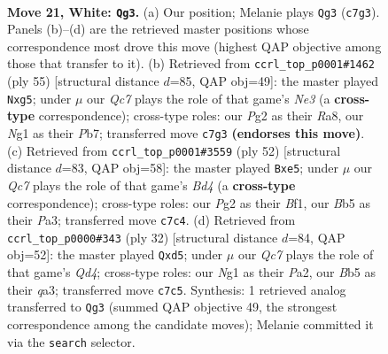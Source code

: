 \documentclass[11pt]{article}
\begin{document}
\clearpage

\begin{figure}[p]\centering
\begin{subfigure}{0.46\textwidth}\centering
\resizebox{\linewidth}{!}{%
\newchessgame
\chessboard[
  setfen={rn5r/2Q5/5p1k/pB1p3p/3P3q/4p3/PP3PP1/1R2K1N1 w - - 2 21},
  showmover=false,
  pgfstyle=straightmove, color=movearrow, markmove={c7-g3}
]}
\caption{}
\end{subfigure}\hfill
\begin{subfigure}{0.46\textwidth}\centering
\resizebox{\linewidth}{!}{%
\newchessgame
\chessboard[
  setfen={r5k1/pp6/1nppn3/5qBp/3P4/Q4P2/PP5P/4N1RK b - - 6 28},
  showmover=false,
  pgfstyle=straightmove, color=movearrow, markmove={e6-g5}
]}
\caption{}
\end{subfigure}
\\[4pt]
\begin{subfigure}{0.46\textwidth}\centering
\resizebox{\linewidth}{!}{%
\newchessgame
\chessboard[
  setfen={1k4r1/1p2bpp1/p2p4/4nP2/3Bq3/P5Q1/1PP5/1K1R1B2 w - - 0 27},
  showmover=false,
  pgfstyle=straightmove, color=movearrow, markmove={d4-e5}
]}
\caption{}
\end{subfigure}\hfill
\begin{subfigure}{0.46\textwidth}\centering
\resizebox{\linewidth}{!}{%
\newchessgame
\chessboard[
  setfen={2r1k2r/1R2bppp/p2p4/3n2B1/3QP3/q7/P1P3PP/4K2R w Kk - 0 17},
  showmover=false,
  pgfstyle=straightmove, color=movearrow, markmove={d4-d5}
]}
\caption{}
\end{subfigure}
\caption{\textbf{Move 21, White: \texttt{Qg3}.} (a) Our position; Melanie plays \texttt{Qg3} (\texttt{c7g3}). Panels (b)--(d) are the retrieved master positions whose correspondence most drove this move (highest QAP objective among those that transfer to it). (b) Retrieved from \texttt{ccrl\_top\_p0001\#1462} (ply 55) [structural distance $d$=85, QAP obj=49]: the master played \texttt{Nxg5}; under $\mu$ our \emph{Qc7} plays the role of that game's \emph{Ne3} (a \textbf{cross-type} correspondence); cross-type roles: our \emph{P}g2 as their \emph{R}a8, our \emph{N}g1 as their \emph{P}b7; transferred move \texttt{c7g3} \textbf{(endorses this move)}. (c) Retrieved from \texttt{ccrl\_top\_p0001\#3559} (ply 52) [structural distance $d$=83, QAP obj=58]: the master played \texttt{Bxe5}; under $\mu$ our \emph{Qc7} plays the role of that game's \emph{Bd4} (a \textbf{cross-type} correspondence); cross-type roles: our \emph{P}g2 as their \emph{B}f1, our \emph{B}b5 as their \emph{P}a3; transferred move \texttt{c7c4}. (d) Retrieved from \texttt{ccrl\_top\_p0000\#343} (ply 32) [structural distance $d$=84, QAP obj=52]: the master played \texttt{Qxd5}; under $\mu$ our \emph{Qc7} plays the role of that game's \emph{Qd4}; cross-type roles: our \emph{N}g1 as their \emph{P}a2, our \emph{B}b5 as their \emph{q}a3; transferred move \texttt{c7c5}. Synthesis: 1 retrieved analog transferred to \texttt{Qg3} (summed QAP objective 49, the strongest correspondence among the candidate moves); Melanie committed it via the \texttt{search} selector.}
\label{fig:thought-m40}
\end{figure}
\end{document}
